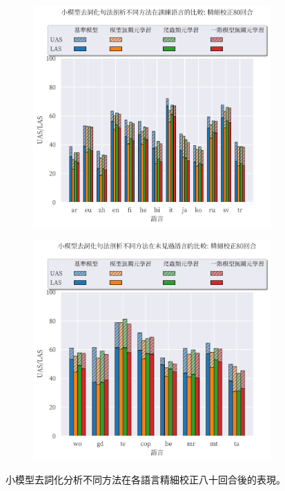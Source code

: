 \begin{figure}[htbp]
    \centering
    \begin{subfigure}[t]{0.8\textwidth}
        \centering
        \includegraphics[width=\textwidth]{figs/chapter3/delex/bar_small_full_epoch_80_train_langs.pdf}
    \end{subfigure}
    \vspace{-12pt}
    \begin{subfigure}[t]{0.8\textwidth}
        \centering
        \includegraphics[width=\textwidth]{figs/chapter3/delex/bar_small_full_epoch_80_test_langs.pdf}
    \end{subfigure}
    \caption{小模型去詞化分析不同方法在各語言精細校正八十回合後的表現。}
    \label{fig:bar_small_full_epoch_80}
\end{figure}
